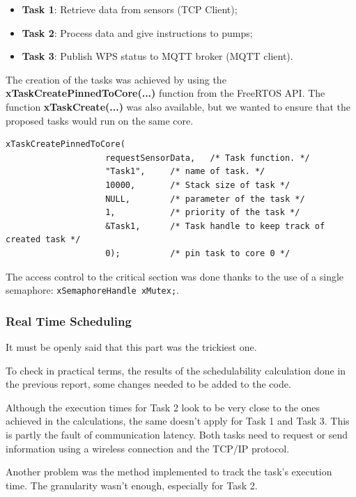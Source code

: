 \documentclass[11pt]{article}
\begin{document}
\begin{itemize}
	\item  \textbf{Task 1}: Retrieve data from sensors (TCP Client);
	\item  \textbf{Task 2}: Process data and give instructions to pumps;
	\item  \textbf{Task 3}: Publish WPS status to MQTT broker (MQTT client).
\end{itemize}

\noindent
The creation of the tasks was achieved by using the \textbf{xTaskCreatePinnedToCore(...)} \cite{c1} function from the FreeRTOS API. The function \textbf{xTaskCreate(...)} was also available, but we wanted to ensure that the proposed tasks would run on the same core.

\begin{verbatim}
xTaskCreatePinnedToCore(
                    requestSensorData,   /* Task function. */
                    "Task1",     /* name of task. */
                    10000,       /* Stack size of task */
                    NULL,        /* parameter of the task */
                    1,           /* priority of the task */
                    &Task1,      /* Task handle to keep track of created task */
                    0);          /* pin task to core 0 */  
\end{verbatim}

The access control to the critical section was done thanks to the use of a single semaphore: \texttt{xSemaphoreHandle xMutex;}.

\subsubsection{Real Time Scheduling}

It must be openly said that this part was the trickiest one.

To check in practical terms, the results of the schedulability calculation done in the previous report, some changes needed to be added to the code.

Although the execution times for Task 2 look to be very close to the ones achieved in the calculations, the same doesn't apply for Task 1 and Task 3. This is partly the fault of communication latency. Both tasks need to request or send information using a wireless connection and the TCP/IP protocol.

Another problem was the method implemented to track the task's execution time. The granularity wasn't enough, especially for Task 2.
\end{document}
